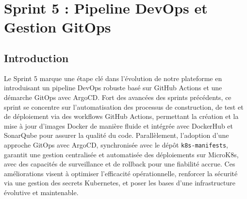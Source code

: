 \chapter{Sprint 5 : Pipeline DevOps et Gestion GitOps}
\section{Introduction}
Le Sprint 5 marque une étape clé dans l’évolution de notre plateforme en introduisant un pipeline DevOps robuste basé sur GitHub Actions et une démarche GitOps avec ArgoCD. Fort des avancées des sprints précédents, ce sprint se concentre sur l’automatisation des processus de construction, de test et de déploiement via des workflows GitHub Actions, permettant la création et la mise à jour d’images Docker de manière fluide et intégrée avec DockerHub et SonarQube pour assurer la qualité du code. Parallèlement, l’adoption d’une approche GitOps avec ArgoCD, synchronisée avec le dépôt \texttt{k8s-manifests}, garantit une gestion centralisée et automatisée des déploiements sur MicroK8s, avec des capacités de surveillance et de rollback pour une fiabilité accrue. Ces améliorations visent à optimiser l’efficacité opérationnelle, renforcer la sécurité via une gestion des secrets Kubernetes, et poser les bases d’une infrastructure évolutive et maintenable.
